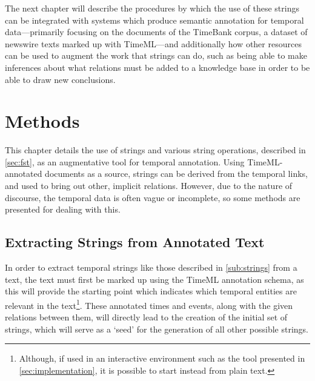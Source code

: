 \documentclass[a4paper,12pt,leqno]{article}
\begin{document}
The next chapter will describe the procedures by which the use of these strings can be integrated with systems which produce semantic annotation for temporal data---primarily focusing on the documents of the TimeBank corpus, a dataset of newswire texts marked up with TimeML---and additionally how other resources can be used to augment the work that strings can do, such as being able to make inferences about what relations must be added to a knowledge base in order to be able to draw new conclusions.

\newpage
\section{Methods}\label{sec:methods}
This chapter details the use of strings and various string operations, described in \cref{sec:fst}, as an augmentative tool for temporal annotation. Using TimeML-annotated documents as a source, strings can be derived from the temporal links, and used to bring out other, implicit relations. However, due to the nature of discourse, the temporal data is often vague or incomplete, so some methods are presented for dealing with this.

\subsection{Extracting Strings from Annotated Text}\label{sub:extracting}
In order to extract temporal strings like those described in \cref{sub:strings} from a text, the text must first be marked up using the TimeML \citep{timeml2005timeml} annotation schema, as this will provide the starting point which indicates which temporal entities are relevant in the text\footnote{Although, if used in an interactive environment such as the tool presented in \cref{sec:implementation}, it is possible to start instead from plain text.}. These annotated times and events, along with the given relations between them, will directly lead to the creation of the initial set of strings, which will serve as a `seed' for the generation of all other possible strings.
\end{document}
